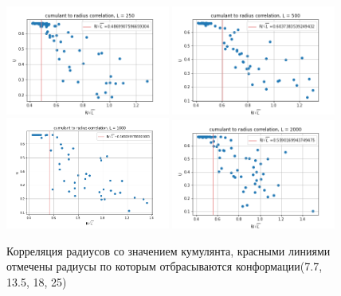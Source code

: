 \begin{figure}[h]
	\centering
	\includegraphics[width=0.48\textwidth]{../images/cumulant_to_R_L250.png} 
	\includegraphics[width=0.48\textwidth]{../images/cumulant_to_R_L500.png} 
	\includegraphics[width=0.48\textwidth]{../images/cumulant_to_R_L1000.png} 
	\includegraphics[width=0.48\textwidth]{../images/cumulant_to_R_L2000.png} 
	\label{fig:cumul_cor}
	\caption{Корреляция радиусов со значением кумулянта, красными линиями отмечены радиусы по которым отбрасываются конформации(7.7, 13.5, 18, 25)}
\end{figure}

